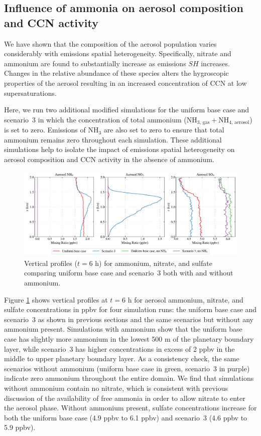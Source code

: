 \subsection{Influence of ammonia on aerosol composition and CCN activity}

We have shown that the composition of the aerosol population varies considerably with emissions spatial heterogeneity. Specifically, nitrate and ammonium are found to substantially increase as emissions $SH$ increases. Changes in the relative abundance of these species alters the hygroscopic properties of the aerosol resulting in an increased concentration of CCN at low supersaturations. 

Here, we run two additional modified simulations for the uniform base case and scenario~3 in which the concentration of total ammonium ($\text{NH}_{3\text{, gas}} + \text{NH}_{4\text{, aerosol}}$) is set to zero. Emissions of NH$_3$ are also set to zero to ensure that total ammonium remains zero throughout each simulation. These additional simulations help to isolate the impact of emissions spatial heterogeneity on aerosol composition and CCN activity in the absence of ammonium.  

\begin{figure}[!t]
  \centering
    \includegraphics[width=\textwidth]{figures/chapter5/aerosol-SNA-vertical-profiles-no-nh4-cases-time36.pdf}
    \caption{Vertical profiles ($t=6$ h) for ammonium, nitrate, and sulfate comparing uniform base case and scenario~3 both with and without ammonium.}
    \label{fig:vert-profiles-no-nh4}
\end{figure}

Figure \ref{fig:vert-profiles-no-nh4} shows vertical profiles at $t=6$ h for aerosol ammonium, nitrate, and sulfate concentrations in ppbv for four simulation runs: the uniform base case and scenario~3 as shown in previous sections and the same scenarios but without any ammonium present. Simulations with ammonium show that the uniform base case has slightly more ammonium in the lowest 500 m of the planetary boundary layer, while scenario~3 has higher concentrations in excess of 2 ppbv in the middle to upper planetary boundary layer. As a consistency check, the same scenarios without ammonium (uniform base case in green, scenario~3 in purple) indicate zero ammonium throughout the entire domain. We find that simulations without ammonium contain no nitrate, which is consistent with previous discussion of the availability of free ammonia in order to allow nitrate to enter the aerosol phase. Without ammonium present, sulfate concentrations increase for both the uniform base case (4.9 ppbv to 6.1 ppbv) and scenario~3 (4.6 ppbv to 5.9 ppbv).


